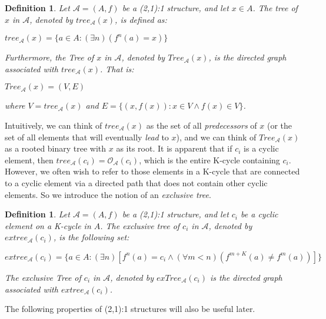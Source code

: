 \documentclass[12pt]{article}
\newtheorem{dfn}[thm]{Definition}
\begin{document}
\begin{dfn}
Let $\mathcal{A} = (A,f)$ be a (2,1):1 structure, and let $x \in A$. The \emph{tree of $x$ in $\mathcal{A}$}, denoted by $tree_{\mathcal{A}}(x)$, is defined as:

\begin{center}
$tree_{\mathcal{A}}(x) = \{a \in A: (\exists n)(f^n(a)=x)\}$
\end{center}

Furthermore, the \emph{Tree of $x$ in $\mathcal{A}$}, denoted by $Tree_{\mathcal{A}}(x)$, is the directed graph associated with $tree_{\mathcal{A}}(x)$. That is:

\begin{center}
$Tree_{\mathcal{A}}(x) = (V,E)$
\end{center}

where $V=tree_{\mathcal{A}}(x)$ and $E=\{(x,f(x)): x \in V \wedge f(x) \in V\}$.
\end{dfn}

Intuitively, we can think of $tree_{\mathcal{A}}(x)$ as the set of all \emph{predecessors} of $x$ (or the set of all elements that will eventually \emph{lead} to $x$), and we can think of $Tree_{\mathcal{A}}(x)$ as a rooted binary tree with $x$ as its root. It is apparent that if $c_i$ is a cyclic element, then $tree_{\mathcal{A}}(c_i) = \mathcal{O}_{\mathcal{A}} (c_i)$, which is the entire K-cycle containing $c_i$. However, we often wish to refer to those elements in a K-cycle that are connected to a cyclic element via a directed path that does not contain other cyclic elements. So we introduce the notion of an \emph{exclusive tree}.

\begin{dfn}
Let $\mathcal{A} = (A,f)$ be a (2,1):1 structure, and let $c_i$ be a cyclic element on a K-cycle in $A$. The \emph{exclusive tree of $c_i$ in $\mathcal{A}$}, denoted by $extree_{\mathcal{A}}(c_i)$, is the following set:
\begin{center}
$extree_{\mathcal{A}}(c_i) = \{a \in A: (\exists n)[f^n(a)=c_i \wedge (\forall m<n)(f^{m+K}(a) \not= f^m(a))]\}$
\end{center}
The \emph{exclusive Tree of $c_i$ in $\mathcal{A}$}, denoted by $exTree_{\mathcal{A}}(c_i)$ is the directed graph associated with $extree_{\mathcal{A}}(c_i)$.
\end{dfn}
\bigskip

The following properties of (2,1):1 structures will also be useful later.\\
\end{document}
